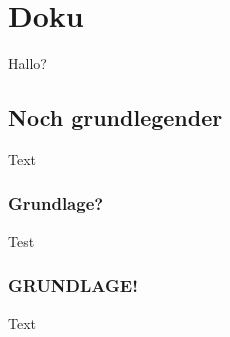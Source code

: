 \section{Doku}
\label{sec:doku}

Hallo?

\subsection{Noch grundlegender}
Text

\subsubsection{Grundlage?}
Test

\subsubsection{GRUNDLAGE!}
Text